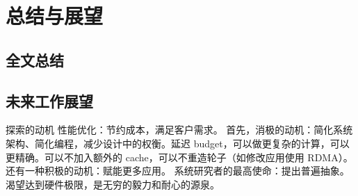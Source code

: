 \chapter{总结与展望}

\section{全文总结}

\section{未来工作展望}


探索的动机
性能优化：节约成本，满足客户需求。
首先，消极的动机：简化系统架构、简化编程，减少设计中的权衡。延迟 budget，可以做更复杂的计算，可以更精确。可以不加入额外的 cache，可以不重造轮子（如修改应用使用 RDMA）。
还有一种积极的动机：赋能更多应用。
系统研究者的最高使命：提出普遍抽象。
渴望达到硬件极限，是无穷的毅力和耐心的源泉。
